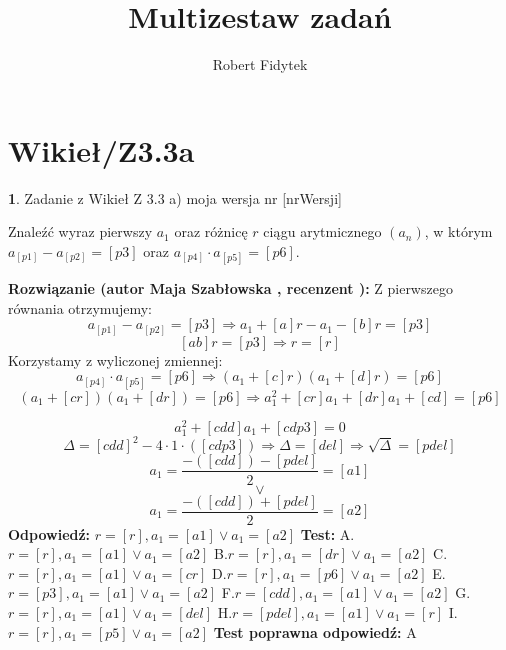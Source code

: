 \documentclass[12pt, a4paper]{article}
\title{Multizestaw zadań}
\author{Robert Fidytek}
\date{}
\theoremstyle{definition} %
\newtheorem{zad}{}
\newcommand{\kategoria}[1]{\section{#1}} %
\newcommand{\zadStart}[1]{\begin{zad}#1\newline} %
\newcommand{\zadStop}{\end{zad}}   %
\newcommand{\rozwStart}[2]{\noindent \textbf{Rozwiązanie (autor #1 , recenzent #2): }\newline} %
\newcommand{\rozwStop}{\newline}                                            %
\newcommand{\odpStart}{\noindent \textbf{Odpowiedź:}\newline}    %
\newcommand{\odpStop}{\newline}                                             %
\newcommand{\testStart}{\noindent \textbf{Test:}\newline} %
\newcommand{\testStop}{\newline} %
\newcommand{\kluczStart}{\noindent \textbf{Test poprawna odpowiedź:}\newline} %
\newcommand{\kluczStop}{\newline} %
\begin{document}
\maketitle


\kategoria{Wikieł/Z3.3a}
\zadStart{Zadanie z Wikieł Z 3.3 a)  moja wersja nr [nrWersji]}


Znaleźć wyraz pierwszy $a_{1}$ oraz różnicę $r$ ciągu arytmicznego $(a_{n})$, w którym $a_{[p1]}-a_{[p2]}=[p3]$ oraz $a_{[p4]}\cdot a_{[p5]}=[p6].$
\zadStop
\rozwStart{Maja Szabłowska}{}
Z pierwszego równania otrzymujemy:
$$a_{[p1]}-a_{[p2]}=[p3] \Rightarrow a_{1}+[a]r-a_{1}-[b]r=[p3]$$
$$[ab]r=[p3] \Rightarrow r=[r]$$
Korzystamy z wyliczonej zmiennej:
$$a_{[p4]}\cdot a_{[p5]}=[p6] \Rightarrow (a_{1}+[c]r)(a_{1}+[d]r)=[p6] $$
$$(a_{1}+[cr])(a_{1}+[dr])=[p6] \Rightarrow a_{1}^{2}+[cr]a_{1}+[dr]a_{1}+[cd]=[p6] $$

$$a_{1}^{2}+[cdd]a_{1}+[cdp3]=0 $$
$$\Delta=[cdd]^{2}-4\cdot1\cdot([cdp3]) \Rightarrow \Delta=[del] \Rightarrow \sqrt{\Delta}=[pdel]$$
$$a_{1}=\frac{-([cdd])-[pdel]}{2}=[a1]$$ $$\lor$$ $$ a_{1}=\frac{-([cdd])+[pdel]}{2}=[a2] $$
\rozwStop
\odpStart
$r=[r], a_{1}=[a1] \lor a_{1}=[a2]$
\odpStop
\testStart
A.$r=[r], a_{1}=[a1] \lor a_{1}=[a2]$
B.$r=[r], a_{1}=[dr] \lor a_{1}=[a2]$
C.$r=[r], a_{1}=[a1] \lor a_{1}=[cr]$
D.$r=[r], a_{1}=[p6] \lor a_{1}=[a2]$
E.$r=[p3], a_{1}=[a1] \lor a_{1}=[a2]$
F.$r=[cdd], a_{1}=[a1] \lor a_{1}=[a2]$
G.$r=[r], a_{1}=[a1] \lor a_{1}=[del]$
H.$r=[pdel], a_{1}=[a1] \lor a_{1}=[r]$
I.$r=[r], a_{1}=[p5] \lor a_{1}=[a2]$
\testStop
\kluczStart
A
\kluczStop
\end{document}
